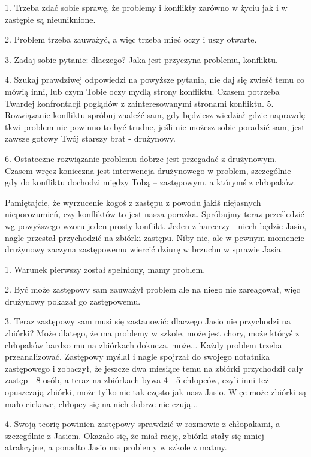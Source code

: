 1.
Trzeba zdać sobie sprawę, że problemy i konflikty zarówno w  życiu jak i w zastępie są nieuniknione.

2.
Problem trzeba zauważyć, a więc trzeba mieć oczy i uszy otwarte.

3.
Zadaj sobie pytanie: dlaczego? Jaka jest przyczyna problemu, konfliktu.

4.
Szukaj prawdziwej odpowiedzi na powyższe pytania, nie daj  się zwieść temu co mówią inni, lub czym Tobie oczy  mydlą  strony konfliktu. Czasem potrzeba Twardej konfrontacji poglądów z zainteresowanymi stronami konfliktu.
5.
Rozwiązanie konfliktu spróbuj znaleźć sam, gdy będziesz wiedział  gdzie naprawdę tkwi problem nie powinno to być trudne, jeśli nie możesz sobie poradzić sam, jest zawsze  gotowy Twój  starszy brat - drużynowy.

6.
Ostateczne rozwiązanie problemu dobrze jest przegadać z drużynowym. Czasem wręcz konieczna jest interwencja drużynowego  w  problem, szczególnie gdy do konfliktu dochodzi między Tobą – zastępowym, a którymś z  chłopaków.


Pamiętajcie, że wyrzucenie kogoś z zastępu z powodu jakiś niejasnych nieporozumień, czy konfliktów to jest nasza porażka. Spróbujmy teraz prześledzić wg  powyższego  wzoru jeden prosty konflikt. Jeden z harcerzy - niech będzie Jasio, nagle przestał przychodzić na zbiórki zastępu. Niby nic, ale w pewnym momencie drużynowy zaczyna zastępowemu wiercić dziurę w brzuchu w  sprawie Jasia.

1.
Warunek  pierwszy  został   spełniony,  mamy  problem.

2.
Być  może  zastępowy  sam zauważył problem ale na niego nie  zareagował, więc drużynowy pokazał go zastępowemu. 

3.
Teraz zastępowy sam musi się zastanowić:  dlaczego Jasio nie  przychodzi na zbiórki? Może dlatego,  że ma problemy w  szkole,  może  jest chory, może któryś z chłopaków bardzo mu na zbiórkach dokucza,  może... Każdy problem trzeba przeanalizować. Zastępowy myślał i nagle spojrzał do  swojego notatnika zastępowego i zobaczył, że jeszcze dwa miesiące  temu na  zbiórki przychodził cały zastęp - 8 osób,  a teraz  na  zbiórkach bywa 4 - 5 chłopców, czyli inni też  opuszczają  zbiórki,  może  tylko nie tak często jak nasz Jasio. Więc może zbiórki są mało  ciekawe,  chłopcy  się na nich dobrze nie czują...

4.
Swoją teorię powinien zastępowy sprawdzić  w rozmowie z chłopakami, a szczególnie z Jasiem. Okazało się, że miał  rację,  zbiórki  stały się mniej atrakcyjne, a ponadto Jasio ma problemy w szkole  z matmy.

